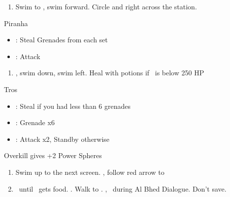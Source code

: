 \begin{enumerate}[resume]
  \item Swim to \save, swim forward. Circle and right across the station.
\end{enumerate}
\begin{battle}{Piranha}
  \begin{itemize}
    \item \rikku: Steal Grenades from each set
    \item \tidus: Attack
  \end{itemize}
\end{battle}
\begin{enumerate}[resume]
  \item \cs, swim down, swim left. Heal with potions if \rikku\ is  below 250 HP
\end{enumerate}
\begin{battle}[2200]{Tros}
  \begin{itemize}
    \item \rikku: Steal if you had less than 6 grenades
    \item \rikku: Grenade x6
    \item \tidus: Attack x2, Standby otherwise
  \end{itemize}
Overkill gives +2 Power Spheres
\end{battle}
\begin{enumerate}[resume]
  \item Swim up to the next screen. \cs, follow red arrow to \cs[0:50]
  \item \sd\ until \tidus \ gets food. \cs[3:00]. Walk to \rikku. \cs[2:30], \sd\ during Al Bhed Dialogue. Don't save.
\end{enumerate}